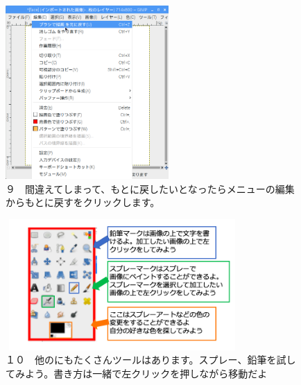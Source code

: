 \documentclass[a4paper,12pt]{jarticle}
\begin{document}
\begin{figure}[ht]
  \begin{minipage}{\textwidth}
    \begin{minipage}{6.984cm}
      \includegraphics[width=6.228cm,height=6.618cm]{textbook-img132.png}\\
      ９　間違えてしまって、もとに戻したいとなったらメニューの編集からもとに戻すをクリックします。
    \end{minipage}
    \hfill
    \begin{minipage}{8.966cm}
      \includegraphics[width=8.881cm,height=4.997cm]{textbook-img133.png}\\
      １０　他のにもたくさんツールはあります。スプレー、鉛筆を試してみよう。書き方は一緒で左クリックを押しながら移動だよ
    \end{minipage}
  \end{minipage}
\end{figure}

~
\end{document}
